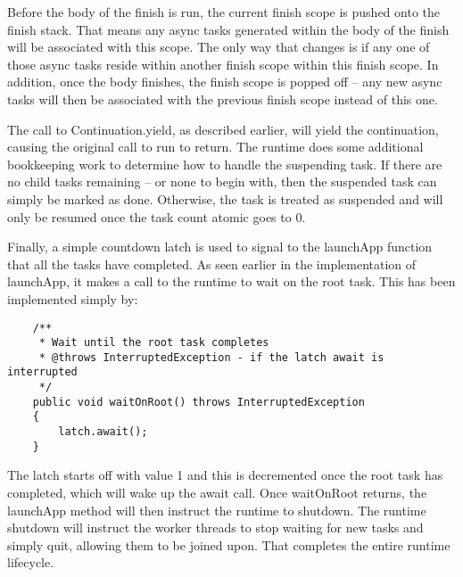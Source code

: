 \documentclass[12pt]{article}
\begin{document}
    Before the body of the finish is run, the current finish scope is pushed onto the finish stack. That
    means any async tasks generated within the body of the finish will be associated with this scope. The
    only way that changes is if any one of those async tasks reside within another finish scope within this
    finish scope. In addition, once the body finishes, the finish scope is popped off -- any new async tasks
    will then be associated with the previous finish scope instead of this one. 

    The call to Continuation.yield, as described earlier, will yield the continuation, causing the original
    call to run to return. The runtime does some additional bookkeeping work to determine how to handle the
    suspending task. If there are no child tasks remaining -- or none to begin with, then the suspended task
    can simply be marked as done. Otherwise, the task is treated as suspended and will only be resumed once
    the task count atomic goes to 0.

    Finally, a simple countdown latch is used to signal to the launchApp function that all the tasks have
    completed. As seen earlier in the implementation of launchApp, it makes a call to the runtime to wait
    on the root task. This has been implemented simply by:

    \begin{lstlisting}
    /**
     * Wait until the root task completes
     * @throws InterruptedException - if the latch await is interrupted
     */
    public void waitOnRoot() throws InterruptedException
    {
        latch.await();
    }
    \end{lstlisting}

    The latch starts off with value 1 and this is decremented once the root task has completed, which will
    wake up the await call. Once waitOnRoot returns, the launchApp method will then instruct the runtime to
    shutdown. The runtime shutdown will instruct the worker threads to stop waiting for new tasks and simply
    quit, allowing them to be joined upon. That completes the entire runtime lifecycle.
\end{document}
